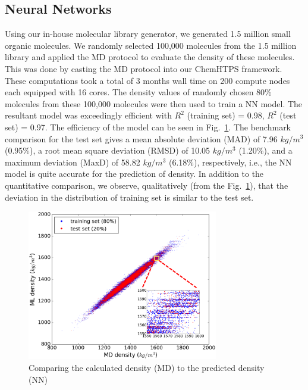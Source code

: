 \subsection{Neural Networks}
\label{subsec:NN_results} 

Using our in-house molecular library generator, we generated 1.5 million small organic molecules. We randomly selected 100,000 molecules from the 1.5 million library and applied the MD protocol to evaluate the density of these molecules. This was done by casting the MD protocol into our ChemHTPS framework. These computations took a total of 3 months wall time on 200 compute nodes each equipped with 16 cores. The density values of randomly chosen 80\% molecules from these 100,000 molecules were then used to train a NN model.  The resultant model was exceedingly efficient with $R^2$ (training set) = 0.98, $R^2$ (test set) = 0.97. The efficiency of the model can be seen in Fig.\ \ref{fig:MD_NN}. The benchmark comparison for the test set gives a mean absolute deviation (MAD) of 7.96 $kg/m^3$ (0.95\%), a root mean square deviation (RMSD) of 10.05 $kg/m^3$ (1.20\%), and a maximum deviation (MaxD) of 58.82 $kg/m^3$ (6.18\%), respectively, i.e., the NN model is quite accurate for the prediction of density. In addition to the quantitative comparison, we observe, qualitatively (from the Fig.\ \ref{fig:MD_NN}), that the deviation in the distribution of training set is similar to the test set. %

\begin{figure}[htbp] 
	\centering
	\includegraphics[width=0.744\textwidth]{Chapter-6/Figures/Comparison_MD_NN.eps}
	\caption{Comparing the calculated density (MD) to the predicted density (NN)}
	\label{fig:MD_NN} 
\end{figure} 

